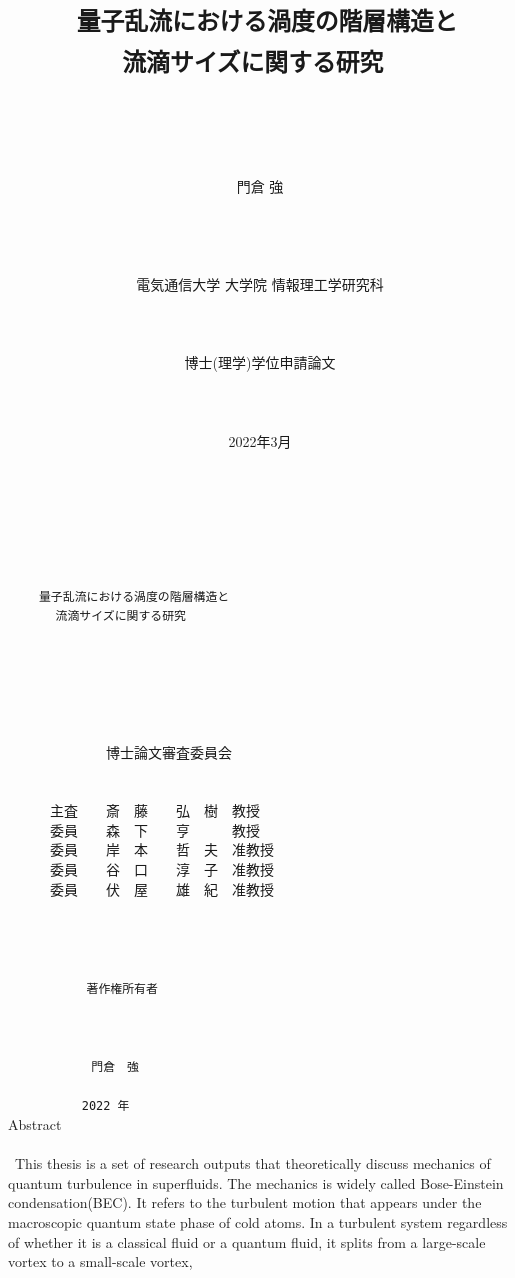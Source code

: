 \documentclass[12pt,a4paper]{jbook}
\title{
    {\huge \tt
        量子乱流における渦度の階層構造と
        \\
        流滴サイズに関する研究
    }
	\\
}
\author{
	\date{}	%
	\\
	\\
	\\
	\\
	\LARGE 門倉 強
	\\
	\\
	\\
	\\
	\\
	\LARGE 電気通信大学 大学院 情報理工学研究科
	\\
	\\
	\\
	\\
	\LARGE 博士(理学)学位申請論文
	\\
	\\
	\\
	\\
	\Large 2022年3月
	\\
}
\begin{document}
	\maketitle

	\newpage
　 
	\\
	\\
	\\
	\\
	{\huge \tt
    　　量子乱流における渦度の階層構造と
        \\
        　　　　流滴サイズに関する研究
	}
	\\
	\\
	\\
	\\
	\\
	\\
	\\
	\LARGE 　　　　　　　博士論文審査委員会
	\\
	\\
	\\
	　　　主査　　斎　藤　　弘　樹　教授
	\\
	　　　委員　　森　下　　亨　　　教授
	\\
	　　　委員　　岸　本　　哲　夫　准教授
	\\
	　　　委員　　谷　口　　淳　子　准教授
	\\
	　　　委員　　伏　屋　　雄　紀　准教授
	\newpage
　　
	\\
	\\
	\\
	\\
	\\
	{\huge \tt
	　　　　　　著作権所有者
	\\
	\\
	\\
	\\
	　　　　　　　門倉　強
	\\
	\\
	　　　　 　  2022 年
	}
	\newpage
	\normalsize
	\ 　
	\\
    {\Huge Abstract}
    \\
    \\
    \ This thesis is a set of research outputs that 
    theoretically discuss mechanics of quantum turbulence in superfluids. 
    The mechanics is widely called Bose-Einstein condensation(BEC).
    It refers to the turbulent motion 
    that appears under the macroscopic quantum state phase of cold atoms. 
    In a turbulent system regardless of whether it is a classical fluid or a quantum fluid,
    it splits from a large-scale vortex to a small-scale vortex,
\end{document}

